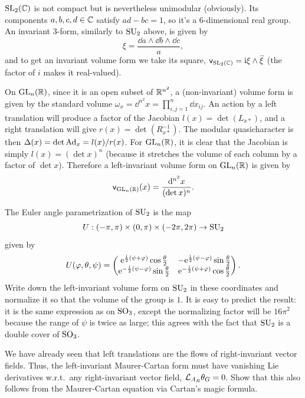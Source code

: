 \begin{example}
    $\operatorname{SL}_2(\mathbb{C})$ is not compact but is nevertheless unimodular (obviously). Its components $a,b,c,d\in\mathbb{C}$ satisfy $ad-bc=1$, so it's a 6-dimensional real group. An invariant 3-form, similarly to $\operatorname{SU}_2$ above, is given by
    \[\xi=\frac{\dd a\wedge\dd b\wedge \dd c}{a},\]
    and to get an invariant volume form we take its square, $\mathsf{v}_{\SL_2(\bbC)}=\rmi\xi\wedge\wb{\xi}$ (the factor of $i$ makes it real-valued).
\end{example}

\begin{example}
    On $\operatorname{GL}_n(\mathbb{R})$, since it is an open subset of $\mathbb{R}^{n^2}$, a (non-invariant) volume form is given by the standard volume $\omega_x=\dd^{n^2} x=\prod_{i,j=1}^n\dd x_{ij}$. An action by a left translation will produce a factor of the Jacobian $l(x)=\det(L_{x\ast})$, and a right translation will give $r(x)=\det(R_{x\ast }^{-1})$. The modular quasicharacter is then $\Delta(x)=\det\mathrm{Ad}_x=l(x)/r(x)$. For $\operatorname{GL}_n(\mathbb{R})$, it is clear that the Jacobian is simply $l(x)=(\det x)^n$ (because it stretches the volume of each column by a factor of $\det x$). Therefore a left-invariant volume form on $\operatorname{GL}_n(\mathbb{R})$ is given by
    \[\mathsf{v}_{\operatorname{GL}_n(\mathbb{R})}(x)=\frac{{\mathrm{d}}^{n^2} x}{(\det x)^n}.\]
\end{example}


\begin{xca}
    The Euler angle parametrization of $\operatorname{SU}_2$ is the map
    \[U:(-\pi,\pi)\times(0,\pi)\times(-2\pi,2\pi)\to \operatorname{SU}_2\]
    given by
    \[U(\varphi,\theta,\psi)=
    \begin{pmatrix}
        \mathrm{e}^{\frac {\mathrm{i}} 2(\psi+\varphi)}\cos\frac{\theta}{2} &  -\mathrm{e}^{\frac {\mathrm{i}} 2(\psi-\varphi)}\sin\frac{\theta}{2}\\
         \mathrm{e}^{-\frac {\mathrm{i}} 2(\psi-\varphi)}\sin\frac{\theta}{2} &  \mathrm{e}^{-\frac {\mathrm{i}} 2(\psi+\varphi)}\cos\frac{\theta}{2}
    \end{pmatrix}.\]
    Write down the left-invariant volume form on $\operatorname{SU}_2$ in these coordinates and normalize it so that the volume of the group is $1$. It is easy to predict the result: it is the same expression as on $\operatorname{SO}_3$, except the normalizing factor will be $16\pi^2$ because the range of $\psi$ is twice as large; this agrees with the fact that $\operatorname{SU}_2$ is a double cover of $\operatorname{SO}_3$.
\end{xca}

\begin{xca}
    We have already seen that left translations are the flows of right-invariant vector fields. Thus, the left-invariant Maurer-Cartan form must have vanishing Lie derivatives w.r.t.\ any right-invariant vector field, $\mathcal{L}_{A_R}\theta_G=0$. Show that this also follows from the Maurer-Cartan equation via Cartan's magic formula.
\end{xca}









